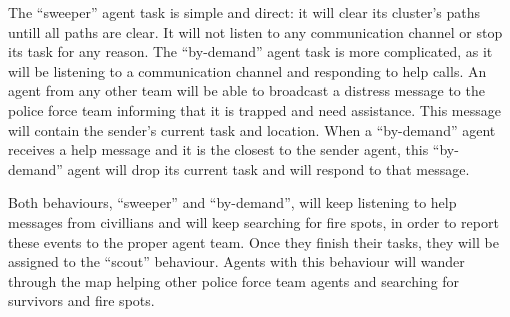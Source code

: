 The ``sweeper'' agent task is simple and direct: it will clear its cluster's paths untill all paths are clear. It will not listen to any communication channel or stop its task for any reason. The ``by-demand'' agent task is more complicated, as it will be listening to a communication channel and responding  to help calls. An agent from any other team will be able to broadcast a distress message to the police force team informing that it is trapped and need assistance. This message will contain the sender's current task and location. When a ``by-demand'' agent receives a help message and it is the closest to the sender agent, this ``by-demand'' agent will drop its current task and will respond to that message.

Both behaviours, ``sweeper'' and ``by-demand'', will keep listening to help messages from civillians and will keep searching for fire spots, in order to report these events to the proper agent team. Once they finish their tasks, they will be assigned to the ``scout'' behaviour. Agents with this behaviour will wander through the map helping other police force team agents and searching for survivors and fire spots.

